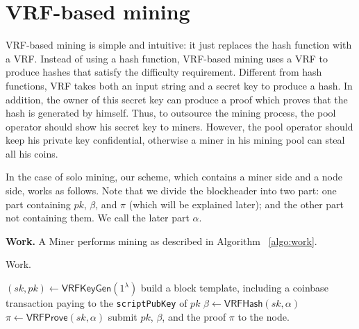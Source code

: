 \section{VRF-based mining}

VRF-based mining is simple and intuitive: it just replaces the hash function with a VRF.
Instead of using a hash function, VRF-based mining uses a VRF to produce hashes that satisfy the difficulty requirement.
Different from hash functions, VRF takes both an input string and a secret key to produce a hash.
In addition, the owner of this secret key can produce a proof which proves that the hash is generated by himself.
Thus, to outsource the mining process, the pool operator should show his secret key to miners.
However, the pool operator should keep his private key confidential, otherwise a miner in his mining pool can steal all his coins.



In the case of solo mining, our scheme, which contains a miner side and a node side, works as follows. Note that we divide the blockheader into two part:
one part containing $pk$, $\beta$, and $\pi$ (which will be explained later);
and the other part not containing them.
We call the later part $\alpha$.



\textbf{Work.}
A Miner performs mining as described in Algorithm ~\ref{algo:work}.

\begin{algorithm}[H]
\caption{Work.}
\label{algo:work}
\SetAlgoLined
  $(sk, pk) \gets \mathsf{VRFKeyGen}(1^{\lambda})$\;
  build a block template, including a coinbase transaction paying to the \texttt{scriptPubKey} of $pk$\;
  $\beta \gets \mathsf{VRFHash}(sk, \alpha)$\;
  $\pi \gets \mathsf{VRFProve}(sk, \alpha)$\;
  submit $pk$, $\beta$, and the proof $\pi$ to the node.
\end{algorithm}






